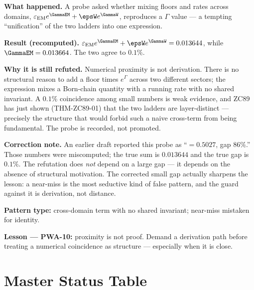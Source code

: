 \documentclass[12pt, a4paper]{article}
\renewcommand{\epsEM}{\varepsilon_{\rm EM}}     %
\begin{document}
\begin{derivedbox}[title={PM-ZC89-PROBE-C-01: Cross-Domain Probe Refuted}]
\textbf{What happened.}
A probe asked whether mixing floors and rates across domains,
$\epsEM e^{\GammaEM}+\epsW e^{\GammaW}$, reproduces a $\Gamma$ value ---
a tempting ``unification'' of the two ladders into one expression.

\textbf{Result (recomputed).}
$\epsEM e^{\GammaEM}+\epsW e^{\GammaW}=0.013644$, while $\GammaEM=0.013664$.
The two agree to $0.1\%$.

\textbf{Why it is still refuted.}
Numerical proximity is not derivation. There is no structural reason to add
a floor times $e^{\Gamma}$ across two different sectors; the expression
mixes a Born-chain quantity with a running rate with no shared invariant.
A $0.1\%$ coincidence among small numbers is weak evidence, and ZC89 has
just shown (THM-ZC89-01) that the two ladders are layer-distinct ---
precisely the structure that would forbid such a naive cross-term from
being fundamental. The probe is recorded, not promoted.

\textbf{Correction note.}
An earlier draft reported this probe as ``$=0.5027$, gap $86\%$.'' Those
numbers were miscomputed; the true sum is $0.013644$ and the true gap is
$0.1\%$. The refutation does \emph{not} depend on a large gap --- it depends
on the absence of structural motivation. The corrected small gap actually
sharpens the lesson: a near-miss is the most seductive kind of false
pattern, and the guard against it is derivation, not distance.

\textbf{Pattern type:} cross-domain term with no shared invariant;
near-miss mistaken for identity.

\textbf{Lesson --- PWA-10:} proximity is not proof. Demand a derivation path
before treating a numerical coincidence as structure --- especially when it
is close.
\end{derivedbox}

\section{Master Status Table}
\end{document}
